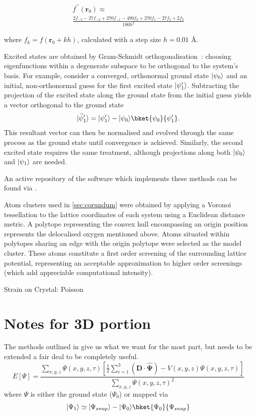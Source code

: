 \begin{multline}
f^{\prime\prime}(\mathbf{r}_0)\approx\\
\frac{2f_{-3}-27f_{-2}+270f_{-1}-490f_{0}+270f_{1}-27f_{2}+2f_{3}}{180h^{2}}
\end{multline}

where $f_k=f\left(\mathbf{r}_0+kh\right)$, calculated with a step size $h=0.01$ \AA. %

Excited states are obtained by Gram-Schmidt orthogonalisation~\cite{Gram1883, Schmidt1907}: choosing eigenfunctions within a degenerate subspace to be orthogonal to the system's basis.
For example, consider a converged, orthonormal ground state $\lvert\psi_0\rangle$ and an initial, non-orthonormal guess for the first excited state $\lvert\psi^\prime_1\rangle$.
Subtracting the projection of the excited state along the ground state from the initial guess yields a vector orthogonal to the ground state
\begin{equation}
\lvert\widetilde{\psi}^\prime_1\rangle = \ket{\psi^\prime_1}-\ket{\psi_0}\bket{\psi_0}{\psi^\prime_1}.
\end{equation}
This resultant vector can then be normalised and evolved through the same process as the ground state until convergence is achieved.
Similarly, the second excited state requires the same treatment, although projections along both $\lvert\psi_0\rangle$ and $\lvert\psi_1\rangle$ are needed.

An active repository of the software which implements these methods can be found via .

Atom clusters used in \cref{sec:corundum} were obtained by applying a Voronoi tessellation\cite{Voronoi1908} to the lattice coordinates of each system using a Euclidean distance metric.
A polytope representing the convex hull encompassing an origin position represents the delocalised oxygen mentioned above.
Atoms situated within polytopes sharing an edge with the origin polytope were selected as the model cluster.
These atoms constitute a first order screening of the surrounding lattice potential, representing an acceptable approximation to higher order screenings (which add appreciable computational intensity).


Strain on Crystal:
Poisson \cite{Poisson1829}

\section{Notes for 3D portion}
The methods outlined in \cite{Strickland2010} give us what we want for the most part, but needs to be extended a fair deal to be completely useful.
\begin{equation}
E[\Psi] = \frac{\sum_{x,y,z}\Psi(x,y,z,\tau)\left[\frac{1}{2}\sum_{i=1}^3\left(\mathbf{D\cdot\widehat{\Psi}}\right)-V(x,y,z)\Psi(x,y,z,\tau)\right]}{\sum_{x,y,z}\Psi(x,y,z,\tau)^2}
\end{equation}
where $\Psi$ is either the ground state ($\Psi_0$) or mapped via
\begin{equation}
 \ket{\Psi_1} \simeq \ket{\Psi_{snap}} - \ket{\Psi_0}\bket{\Psi_0}{\Psi_{snap}}
\end{equation}

